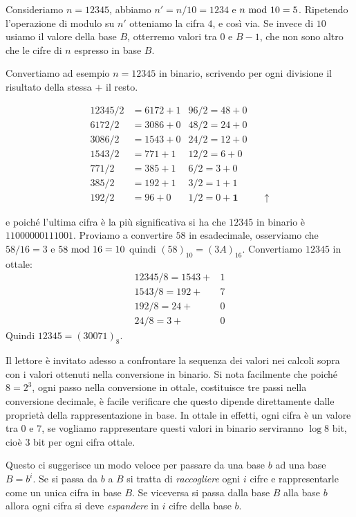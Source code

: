 \begin{ex}
Consideriamo $n = 12345$, abbiamo $n' = n/10 = 1234$ e $n \ \text{mod}\ 10 = 5$. Ripetendo l'operazione di modulo su $n'$ otteniamo la cifra $4$, e così via. Se
invece di $10$ usiamo il valore della base $B$, otterremo valori tra $0$ e $B-1$, che non sono altro che le cifre di $n$ espresso in base $B$.

Convertiamo ad esempio $n = 12345$ in binario, scrivendo per ogni divisione il risultato della stessa $+$ il resto.

\begin{align*}
 12345 / 2 &= 6172 + 1   &96 / 2 = 48 + 0\\
 6172  / 2 &= 3086 + 0   &48 / 2 = 24 + 0\\
 3086  / 2 &= 1543 + 0   &24 / 2 = 12 + 0\\
 1543  / 2 &= 771 + 1    &12 / 2 = 6 + 0\\
 771   / 2 &= 385 + 1    &6 / 2  = 3 + 0\\
 385   / 2 &= 192 + 1    &3 / 2  = 1 + 1\\
 192   / 2 &= 96 + 0     &1 / 2  = 0 + \mathbf{1}& \quad \uparrow
\end{align*}

\noindent e poiché l'ultima cifra è la più significativa si ha che $12345$ in binario è $11000000111001$. Proviamo a convertire $58$ in esadecimale, osserviamo che $58/16 = 3$ e $58 \ \text{mod}\ 16 = 10$ quindi $(58)_{10} = (3A)_{16}$. Convertiamo $12345$ in ottale:
\begin{align*}
 12345 / 8 = 1543 + &1 \\
 1543  / 8 = 192 + &7   \\
 192  / 8  = 24 + &0 \\
 24  / 8   = 3 + &0
\end{align*}
\noindent Quindi $12345 = (30071)_8$.
\end{ex}

Il lettore è invitato adesso a confrontare la sequenza dei valori nei calcoli sopra con i valori ottenuti nella conversione in binario. Si nota facilmente che poiché $8 = 2^3$, ogni passo nella conversione in ottale, costituisce tre passi nella conversione decimale, è facile verificare che questo dipende direttamente dalle proprietà della rappresentazione in base. In ottale in effetti, ogni cifra è un valore tra $0$ e $7$, se vogliamo rappresentare questi valori in binario serviranno $\log 8$ bit, cioè $3$ bit per ogni cifra ottale.

Questo ci suggerisce un modo veloce per passare da una base $b$ ad una base $B=b^i$. Se si passa da $b$ a $B$ si tratta di \emph{raccogliere} ogni $i$ cifre e rappresentarle come un unica cifra in base $B$. Se viceversa si passa dalla base $B$ alla base $b$ allora ogni cifra si deve \emph{espandere} in $i$
cifre della base $b$.

